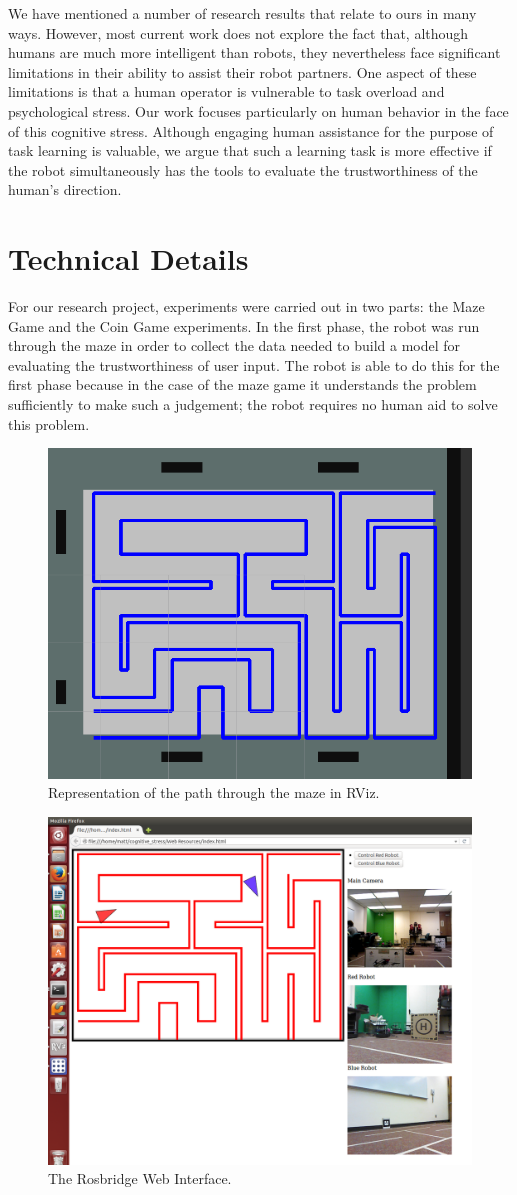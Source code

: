 \documentclass{sig-alternate}
\begin{document}
We have mentioned a number of research results that relate to ours in
many ways.  However, most current work does not explore the fact that,
although humans are much more intelligent than robots, they
nevertheless face significant limitations in their ability to assist
their robot partners.  One aspect of these limitations is that a human
operator is vulnerable to task overload and psychological stress.  Our
work focuses particularly on human behavior in the face of this
cognitive stress.  Although engaging human assistance for the purpose
of task learning is valuable, we argue that such a learning task is
more effective if the robot simultaneously has the tools to evaluate
the trustworthiness of the human's direction.

\section{Technical Details}
For our research project, experiments were carried out in two parts:
the Maze Game and the Coin Game experiments. In the first phase, the
robot was run through the maze in order to collect the data needed to
build a model for evaluating the trustworthiness of user input. The
robot is able to do this for the first phase because in the case of
the maze game it understands the problem sufficiently to make such a
judgement; the robot requires no human aid to solve this problem.

\begin{figure}
\centering 
\includegraphics[width=.5\textwidth]{rviz_maze.png} 
\caption{Representation of the path through the maze in RViz.}
\label{fig:rviz_map}
\end{figure}

\begin{figure}
\includegraphics[width=.5\textwidth]{web-controller.png}
\caption{The Rosbridge Web Interface.}
\label{fig:web_interface_img}
\end{figure}
\end{document}
